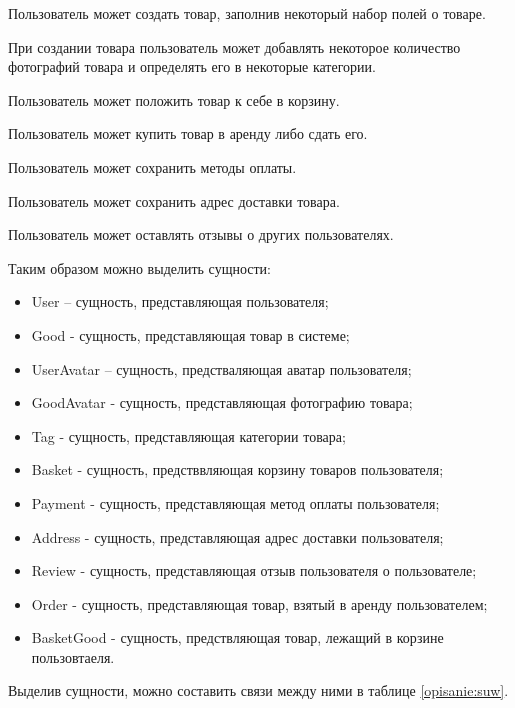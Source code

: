 Пользователь может создать товар, заполнив некоторый набор полей о товаре.

При создании товара пользователь может добавлять некоторое количество фотографий товара и определять его в некоторые категории.

Пользователь может положить товар к себе в корзину.

Пользователь может купить товар в аренду либо сдать его.

Пользователь может сохранить методы оплаты.

Пользователь может сохранить адрес доставки товара.

Пользователь может оставлять отзывы о других пользователях.

Таким образом можно выделить сущности:
\begin{itemize}
    \item User – сущность, представляющая пользователя;
    \item Good - сущность, представляющая товар в системе;
    \item UserAvatar – сущность, предстваляющая аватар пользователя;
    \item GoodAvatar - сущность, представляющая фотографию товара;
    \item Tag - сущность, представляющая категории товара;
    \item Basket - сущность, предстввляющая корзину товаров пользователя;
    \item Payment - сущность, представляющая метод оплаты пользователя;
    \item Address - сущность, представляющая адрес доставки пользователя;
    \item Review - сущность, представляющая отзыв пользователя о пользователе;
    \item Order - сущность, представляющая товар, взятый в аренду пользователем;
    \item BasketGood - сущность, предствляющая товар, лежащий в корзине пользовтаеля.
\end{itemize}

Выделив сущности, можно составить связи между ними в таблице \ref{opisanie:suw}.



